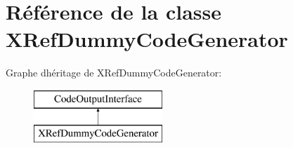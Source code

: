 \hypertarget{class_x_ref_dummy_code_generator}{}\section{Référence de la classe X\+Ref\+Dummy\+Code\+Generator}
\label{class_x_ref_dummy_code_generator}
Graphe d\textquotesingle{}héritage de X\+Ref\+Dummy\+Code\+Generator\+:\begin{figure}[H]
\begin{center}
\leavevmode
\includegraphics[height=2.000000cm]{class_x_ref_dummy_code_generator}
\end{center}
\end{figure}
